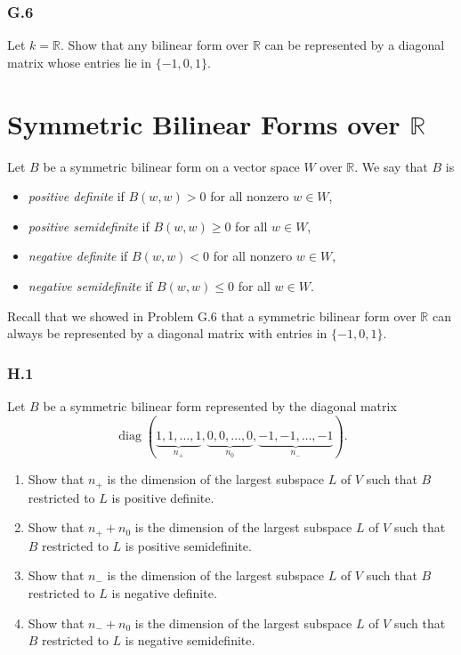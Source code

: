 \documentclass[lang=cn,11pt]{template}
\begin{document}
\subsection*{G.6} Let \( k = \mathbb{R} \). Show that any bilinear form over \( \mathbb{R} \) can be represented by a diagonal matrix whose entries lie in \( \{-1, 0, 1\} \).








\chapter{Symmetric Bilinear Forms over \( \mathbb{R} \)}

Let \( B \) be a symmetric bilinear form on a vector space \( W \) over \( \mathbb{R} \). We say that \( B \) is
\begin{itemize}
    \item \textit{positive definite} if \( B(w, w) > 0 \) for all nonzero \( w \in W \),
    \item \textit{positive semidefinite} if \( B(w, w) \geq 0 \) for all \( w \in W \),
    \item \textit{negative definite} if \( B(w, w) < 0 \) for all nonzero \( w \in W \),
    \item \textit{negative semidefinite} if \( B(w, w) \leq 0 \) for all \( w \in W \).
\end{itemize}

Recall that we showed in Problem G.6 that a symmetric bilinear form over \( \mathbb{R} \) can always be represented by a diagonal matrix with entries in \( \{-1, 0, 1\} \).

\subsection*{H.1} Let \( B \) be a symmetric bilinear form represented by the diagonal matrix
\[
\operatorname{diag}(\underbrace{1, 1, \dots, 1}_{n_+}, \underbrace{0, 0, \dots, 0}_{n_0}, \underbrace{-1, -1, \dots, -1}_{n_-}).
\]
\begin{enumerate}
    \item Show that \( n_+ \) is the dimension of the largest subspace \( L \) of \( V \) such that \( B \) restricted to \( L \) is positive definite.
    \item Show that \( n_+ + n_0 \) is the dimension of the largest subspace \( L \) of \( V \) such that \( B \) restricted to \( L \) is positive semidefinite.
    \item Show that \( n_- \) is the dimension of the largest subspace \( L \) of \( V \) such that \( B \) restricted to \( L \) is negative definite.
    \item Show that \( n_- + n_0 \) is the dimension of the largest subspace \( L \) of \( V \) such that \( B \) restricted to \( L \) is negative semidefinite.
\end{enumerate}
\end{document}
